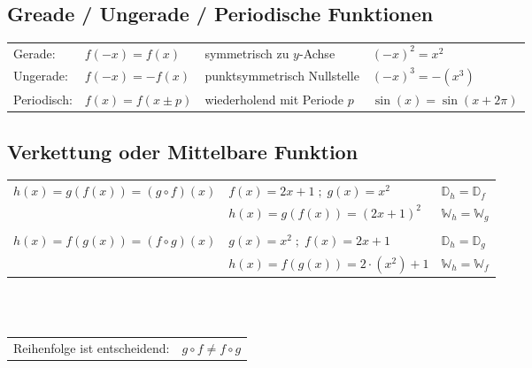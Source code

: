 \subsection{Greade / Ungerade / Periodische Funktionen}

\renewcommand{\arraystretch}{1}
{\setlength{\tabcolsep}{4pt}
\begin{tabular}{llll} 
        Gerade:     & $f(-x) = f(x)$        & symmetrisch zu $y$-Achse      &     $(-x)^2 = x^2$ \\
        Ungerade:   & $f(-x) = -f(x)$       & punktsymmetrisch Nullstelle   &     $(-x)^3 = -(x^3)$ \\
        Periodisch: & $f(x) = f(x \pm p)$   & wiederholend mit Periode $p$	&     $\sin(x) = \sin(x+2\pi)$					
\end{tabular}}

\subsection{Verkettung oder Mittelbare Funktion}

\renewcommand{\arraystretch}{1.3}
{\setlength{\tabcolsep}{6pt}
\begin{tabular}{lll}
$ h(x) = g(f(x)) = (g \circ f)(x)$ & $ f(x) = 2x + 1 \;;\; g(x) = x^2$ & $\mathbb{D}_h = \mathbb{D}_f$ \\
                                   & $ h(x) = g(f(x)) = (2x + 1)^2$    & $\mathbb{W}_h = \mathbb{W}_g$ \\
\\
$ h(x) = f(g(x)) = (f \circ g)(x)$ & $ g(x) = x^2 \;;\; f(x) = 2x + 1$      & $\mathbb{D}_h = \mathbb{D}_g$ \\
                                   & $ h(x) = f(g(x)) = 2\cdot(x^2) + 1$    & $\mathbb{W}_h = \mathbb{W}_f$ 
\end{tabular}}\\ \\
\begin{tabular}{lc}
    Reihenfolge ist entscheidend: & $ g \circ f \neq f \circ g$
\end{tabular}

